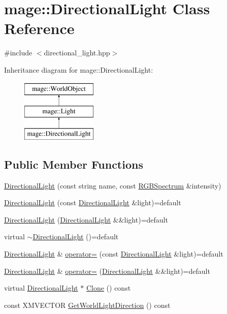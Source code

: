 \hypertarget{classmage_1_1_directional_light}{}\section{mage\+:\+:Directional\+Light Class Reference}
\label{classmage_1_1_directional_light}


{\ttfamily \#include $<$directional\+\_\+light.\+hpp$>$}

Inheritance diagram for mage\+:\+:Directional\+Light\+:\begin{figure}[H]
\begin{center}
\leavevmode
\includegraphics[height=3.000000cm]{classmage_1_1_directional_light}
\end{center}
\end{figure}
\subsection*{Public Member Functions}
\begin{DoxyCompactItemize}
\item 
\hyperlink{classmage_1_1_directional_light_a8a5ef8d4445b092db8bbba001e1ce874}{Directional\+Light} (const string name, const \hyperlink{structmage_1_1_r_g_b_spectrum}{R\+G\+B\+Spectrum} \&intensity)
\item 
\hyperlink{classmage_1_1_directional_light_a6939817ef5aeb6347d6d1aa963241f49}{Directional\+Light} (const \hyperlink{classmage_1_1_directional_light}{Directional\+Light} \&light)=default
\item 
\hyperlink{classmage_1_1_directional_light_a61dfbcff7faae4ec2f24b9d4f30c7720}{Directional\+Light} (\hyperlink{classmage_1_1_directional_light}{Directional\+Light} \&\&light)=default
\item 
virtual \hyperlink{classmage_1_1_directional_light_a08f8d1a4b38d18aa4735ddda7d6e0f51}{$\sim$\+Directional\+Light} ()=default
\item 
\hyperlink{classmage_1_1_directional_light}{Directional\+Light} \& \hyperlink{classmage_1_1_directional_light_a4cdc2d83e56d92720f9af12a1a3801a1}{operator=} (const \hyperlink{classmage_1_1_directional_light}{Directional\+Light} \&light)=default
\item 
\hyperlink{classmage_1_1_directional_light}{Directional\+Light} \& \hyperlink{classmage_1_1_directional_light_a9bf3d8fa724b46b7512c74e51e1278c0}{operator=} (\hyperlink{classmage_1_1_directional_light}{Directional\+Light} \&\&light)=default
\item 
virtual \hyperlink{classmage_1_1_directional_light}{Directional\+Light} $\ast$ \hyperlink{classmage_1_1_directional_light_a14e3816a550a992f1060de6da3b36dbf}{Clone} () const
\item 
const X\+M\+V\+E\+C\+T\+OR \hyperlink{classmage_1_1_directional_light_a0ae6286a6058bc22f7fdcea6b87e5c43}{Get\+World\+Light\+Direction} () const
\end{DoxyCompactItemize}

